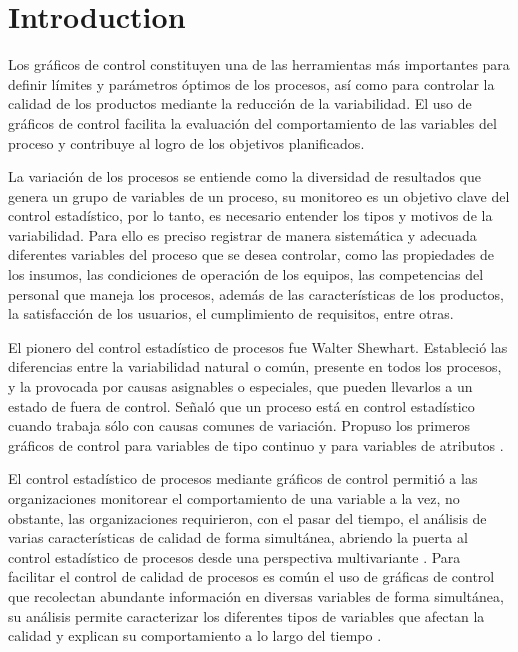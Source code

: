 \documentclass[water,article,submit,moreauthors,pdftex]{mdpi}
\begin{document}

\hypertarget{introduction}{%
\section{Introduction}\label{introduction}}

Los gráficos de control constituyen una de las herramientas más
importantes para definir límites y parámetros óptimos de los procesos,
así como para controlar la calidad de los productos mediante la
reducción de la variabilidad. El uso de gráficos de control facilita la
evaluación del comportamiento de las variables del proceso y contribuye
al logro de los objetivos planificados.

La variación de los procesos se entiende como la diversidad de
resultados que genera un grupo de variables de un proceso, su monitoreo
es un objetivo clave del control estadístico, por lo tanto, es necesario
entender los tipos y motivos de la variabilidad. Para ello es preciso
registrar de manera sistemática y adecuada diferentes variables del
proceso que se desea controlar, como las propiedades de los insumos, las
condiciones de operación de los equipos, las competencias del personal
que maneja los procesos, además de las características de los productos,
la satisfacción de los usuarios, el cumplimiento de requisitos, entre
otras.

El pionero del control estadístico de procesos fue Walter Shewhart.
Estableció las diferencias entre la variabilidad natural o común,
presente en todos los procesos, y la provocada por causas asignables o
especiales, que pueden llevarlos a un estado de fuera de control. Señaló
que un proceso está en control estadístico cuando trabaja sólo con
causas comunes de variación. Propuso los primeros gráficos de control
para variables de tipo continuo y para variables de atributos
\citep{Gutierrez2013}.

El control estadístico de procesos mediante gráficos de control permitió
a las organizaciones monitorear el comportamiento de una variable a la
vez, no obstante, las organizaciones requirieron, con el pasar del
tiempo, el análisis de varias características de calidad de forma
simultánea, abriendo la puerta al control estadístico de procesos desde
una perspectiva multivariante \citep{ramos2017}. Para facilitar el
control de calidad de procesos es común el uso de gráficas de control
que recolectan abundante información en diversas variables de forma
simultánea, su análisis permite caracterizar los diferentes tipos de
variables que afectan la calidad y explican su comportamiento a lo largo
del tiempo \citep{li2012}.
\end{document}

